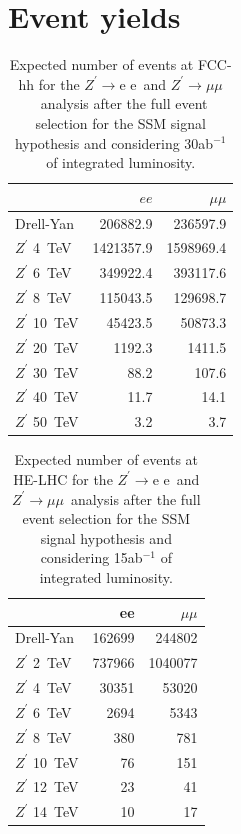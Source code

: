 \documentclass[a4paper,11pt]{article}
\newcommand{\Zp}{\ensuremath{Z^{\prime}}}
\newcommand*{\Zpee}{\ensuremath{Z^{\prime}\rightarrow \text{e e}}}
\newcommand*{\Zpmumu}{\ensuremath{Z^{\prime}\rightarrow \mu\mu}}
\begin{document}
\section{Event yields}
\label{app:yields}
\begin{table}[htbp]
   \centering
\begin{tabular}{|l|r|r|}
  \hline
 & $ee$ & $\mu\mu$  \\
  \hline
  Drell-Yan & 206882.9 & 236597.9 \\
  \hline
  $\Zp$ 4~TeV & 1421357.9    & 1598969.4 \\
  $\Zp$ 6~TeV & 349922.4  & 393117.6\\
  $\Zp$ 8~TeV &   115043.5 & 129698.7 \\
  $\Zp$ 10~TeV &  45423.5 & 50873.3 \\
  $\Zp$ 20~TeV &  1192.3 & 1411.5\\
  $\Zp$ 30~TeV &  88.2 & 107.6\\
  $\Zp$ 40~TeV &  11.7 & 14.1 \\
  $\Zp$ 50~TeV &  3.2 & 3.7\\
  \hline
  \hline
\end{tabular}
  \caption{Expected number of events at FCC-hh for the \Zpee\ and \Zpmumu\ analysis after the full event selection for the SSM signal hypothesis and considering 30ab$^{-1}$ of integrated luminosity.}
  \label{tab:leptonicresonances:yieldsll}
\end{table}

\begin{table}[!htb]
   \centering
\begin{tabular}{|l|r|r|}
  \hline
  \hline
 & ee & $\mu\mu$  \\
  \hline
  Drell-Yan    & 162699 &  244802 \\
  \hline
  $\Zp$ 2~TeV  & 737966 & 1040077 \\
  $\Zp$ 4~TeV  &  30351 &   53020 \\
  $\Zp$ 6~TeV  &   2694 &    5343 \\
  $\Zp$ 8~TeV  &    380 &     781 \\
  $\Zp$ 10~TeV &     76 &     151 \\
  $\Zp$ 12~TeV &     23 &      41 \\
  $\Zp$ 14~TeV &     10 &      17 \\
  \hline
  \hline
\end{tabular}
  \caption{Expected number of events at HE-LHC for the \Zpee\ and \Zpmumu\ analysis after the full event selection for the SSM signal hypothesis and considering 15ab$^{-1}$ of integrated luminosity.}
  \label{tab:leptonicresonances27:yieldsll}
\end{table}
\end{document}
